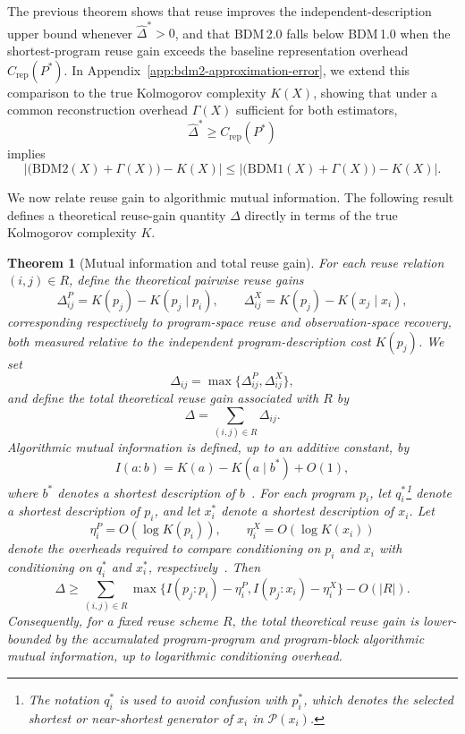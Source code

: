 \documentclass{article}
\newtheorem{theorem}{Theorem}
\begin{document}
The previous theorem shows that reuse improves the independent-description upper bound whenever \(\hat{\Delta}^*>0\), and that BDM\,2.0 falls below BDM\,1.0 when the shortest-program reuse gain exceeds the baseline representation overhead \(C_{\mathrm{rep}}(P^*)\). In Appendix~\ref{app:bdm2-approximation-error}, we extend this comparison to the true Kolmogorov complexity \(K(X)\), showing that under a common reconstruction overhead \(\Gamma(X)\) sufficient for both estimators,
\[
\hat{\Delta}^*
\geq
C_{\mathrm{rep}}(P^*)
\]
implies
\[
\left|
\bigl(\mathrm{BDM2}(X)+\Gamma(X)\bigr)-K(X)
\right|
\leq
\left|
\bigl(\mathrm{BDM1}(X)+\Gamma(X)\bigr)-K(X)
\right|.
\]

We now relate reuse gain to algorithmic mutual information. The following result defines a theoretical reuse-gain quantity \(\Delta\) directly in terms of the true Kolmogorov complexity \(K\).


\begin{theorem}[Mutual information and total reuse gain]
\label{thm:mutual-information-reuse-gain}
For each reuse relation \((i,j)\in R\), define the theoretical pairwise reuse gains
\[
\Delta_{ij}^{P}
=
K(p_j)-K(p_j\mid p_i),
\qquad
\Delta_{ij}^{X}
=
K(p_j)-K(x_j\mid x_i),
\]
corresponding respectively to program-space reuse and observation-space recovery, both measured relative to the independent program-description cost \(K(p_j)\). We set
\[
\Delta_{ij}
=
\max\{\Delta_{ij}^{P},\Delta_{ij}^{X}\},
\]
and define the total theoretical reuse gain associated with \(R\) by
\[
\Delta
=
\sum_{(i,j)\in R}\Delta_{ij}.
\]
Algorithmic mutual information is defined, up to an additive constant, by
\[
I(a:b)=K(a)-K(a\mid b^*)+O(1),
\]
where \(b^*\) denotes a shortest description of \(b\)~\cite{li_introduction_2019}. For each program \(p_i\), let \(q_i^*\)\footnote{The notation \(q_i^*\) is used to avoid confusion with \(p_i^*\), which denotes the selected shortest or near-shortest generator of \(x_i\) in \(\mathcal P(x_i)\).} denote a shortest description of \(p_i\), and let \(x_i^*\) denote a shortest description of \(x_i\). Let
\[
\eta_i^P=O(\log K(p_i)),
\qquad
\eta_i^X=O(\log K(x_i))
\]
denote the overheads required to compare conditioning on \(p_i\) and \(x_i\) with conditioning on \(q_i^*\) and \(x_i^*\), respectively~\cite{li_introduction_2019}. Then
\[
\Delta
\geq
\sum_{(i,j)\in R}
\max\{
I(p_j:p_i)-\eta_i^P,
I(p_j:x_i)-\eta_i^X
\}
-
O(|R|).
\]
Consequently, for a fixed reuse scheme \(R\), the total theoretical reuse gain is lower-bounded by the accumulated program-program and program-block algorithmic mutual information, up to logarithmic conditioning overhead.
\end{theorem}
\end{document}
